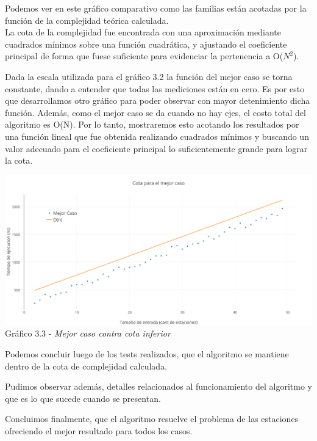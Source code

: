 Podemos ver en este gr\'afico comparativo como las familias est\'an acotadas por la funci\'on de la complejidad te\'orica calculada.\\

La cota de la complejidad fue encontrada con una aproximaci\'on mediante cuadrados m\'inimos sobre una función cuadrática, y ajustando el coeficiente principal de forma que fuese suficiente para evidenciar la pertenencia a O($N^2$).
  
Dada la escala utilizada para el gr\'afico 3.2 la función del mejor caso se torna constante, dando a entender que todas las mediciones están en cero. Es por esto que desarrollamos otro gr\'afico para poder observar con mayor detenimiento dicha funci\'on.
Además, como el mejor caso se da cuando no hay ejes, el costo total del algoritmo es O(N). Por lo tanto, mostraremos esto acotando los resultados por una función lineal que fue obtenida realizando cuadrados m\'inimos y buscando un valor adecuado para el coeficiente principal lo suficientemente grande para lograr la cota.

  \vspace*{0.3cm} \vspace*{0.3cm}
  \begin{center}
\includegraphics[scale=0.5]{./EJ3/Mejorcasoycotainferior.png}
{Gr\'afico 3.3 - \textit{Mejor caso contra cota inferior}}
  \end{center}
  \vspace*{0.3cm}

Podemos concluir luego de los tests realizados, que el algoritmo se mantiene dentro de la cota de complejidad calculada. 

Pudimos observar además, detalles relacionados al funcionamiento del algoritmo y que es lo que sucede cuando se presentan.

Concluimos finalmente, que el algoritmo resuelve el problema de las estaciones ofreciendo el mejor resultado para todos los casos.
